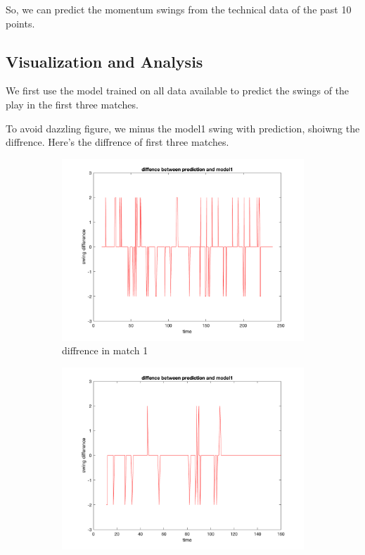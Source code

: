 So, we can predict the momentum swings from the technical data of the past 10 points.

\subsection{Visualization and Analysis}

We first use the model trained on all data available to 
predict the swings of the play in the first three matches.

To avoid dazzling figure, we minus the model1 swing with prediction, shoiwng the diffrence.
Here's the diffrence of first three matches.

\begin{figure}[H]
    \centering
    \begin{subfigure}[b]{0.34\textwidth}
        \includegraphics[width=\linewidth]{mainmatter/imgs/swing_diff_match1_overfit.png}
        \caption{diffrence in match 1}
    \end{subfigure}\hspace{-0.02\textwidth}
    \begin{subfigure}[b]{0.34\textwidth}
        \includegraphics[width=\linewidth]{mainmatter/imgs/swing_diff_match2_overfit.png}

\end{subfigure}
\end{figure}
